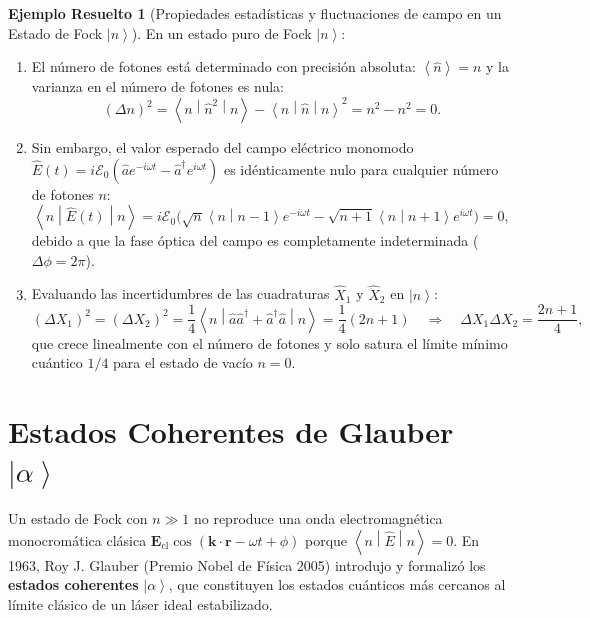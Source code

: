 \documentclass[11pt,a4paper,twoside]{report}
\theoremstyle{definition}
\newtheorem{ejemplo}{Ejemplo Resuelto}[chapter]
\theoremstyle{plain}
\theoremstyle{remark}
\newcommand{\ket}[1]{\left| #1 \right\rangle}
\newcommand{\braket}[2]{\left\langle #1 \middle| #2 \right\rangle}
\newcommand{\mel}[3]{\left\langle #1 \middle| #2 \middle| #3 \right\rangle}
\newcommand{\expval}[1]{\left\langle #1 \right\rangle}
\newcommand{\op}[1]{\hat{#1}}
\begin{document}
\begin{ejemplo}[Propiedades estadísticas y fluctuaciones de campo en un Estado de Fock $\ket{n}$]
En un estado puro de Fock $\ket{n}$:
\begin{enumerate}[label=\arabic*.]
    \item El número de fotones está determinado con precisión absoluta: $\expval{\op{n}} = n$ y la varianza en el número de fotones es nula:
    \begin{equation}
        (\Delta n)^2 = \mel{n}{\op{n}^2}{n} - \mel{n}{\op{n}}{n}^2 = n^2 - n^2 = 0.
    \end{equation}
    \item Sin embargo, el valor esperado del campo eléctrico monomodo $\op{E}(t) = i\mathcal{E}_0(\op{a}e^{-i\omega t} - \op{a}^\dagger e^{i\omega t})$ es idénticamente nulo para cualquier número de fotones $n$:
    \begin{equation}
        \mel{n}{\op{E}(t)}{n} = i\mathcal{E}_0 \big( \sqrt{n}\braket{n}{n-1}e^{-i\omega t} - \sqrt{n+1}\braket{n}{n+1}e^{i\omega t} \big) = 0,
    \end{equation}
    debido a que la fase óptica del campo es completamente indeterminada ($\Delta \phi = 2\pi$).
    \item Evaluando las incertidumbres de las cuadraturas $\op{X}_1$ y $\op{X}_2$ en $\ket{n}$:
    \begin{equation}
        (\Delta X_1)^2 = (\Delta X_2)^2 = \frac{1}{4}\mel{n}{\op{a}\op{a}^\dagger + \op{a}^\dagger\op{a}}{n} = \frac{1}{4}(2n + 1) \quad \Longrightarrow \quad \Delta X_1 \Delta X_2 = \frac{2n+1}{4},
    \end{equation}
    que crece linealmente con el número de fotones y solo satura el límite mínimo cuántico $1/4$ para el estado de vacío $n = 0$.
\end{enumerate}
\end{ejemplo}

\section{\texorpdfstring{Estados Coherentes de Glauber $\ket{\alpha}$}{Estados Coherentes de Glauber (alpha)}}

Un estado de Fock con $n \gg 1$ no reproduce una onda electromagnética monocromática clásica $\bm{E}_{\text{cl}}\cos(\bm{k}\cdot\bm{r}-\omega t + \phi)$ porque $\mel{n}{\op{E}}{n} = 0$. En 1963, Roy J. Glauber (Premio Nobel de Física 2005) introdujo y formalizó los \textbf{estados coherentes} $\ket{\alpha}$, que constituyen los estados cuánticos más cercanos al límite clásico de un láser ideal estabilizado.
\end{document}
